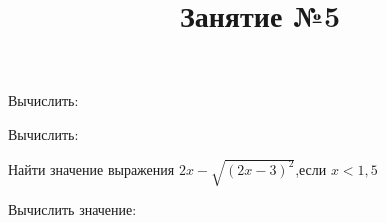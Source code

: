 \begin{listofex}
	\item Вычислить:
	\begin{enumcols}[itemcolumns=4]
		\item {}
		\item {}
		\item {}
		\item {}
	\end{enumcols}
	\item Вычислить:
	\begin{enumcols}[itemcolumns=2]
		\item {}
		\item {}
		\item {}
		\item {}
		\item {}
		\item {}
	\end{enumcols}
	\item {}
	\item {}
	\item Найти значение выражения \( 2x-\sqrt{(2x-3)^2} \),\quad если \( x<1,5\)
	\item Вычислить значение:
	\begin{enumcols}[itemcolumns=3]
		\item {}
		\item {}
		\item {}
		\item {}
		\item {}
	\end{enumcols}
\end{listofex}
\newpage
\title{Занятие №5}
